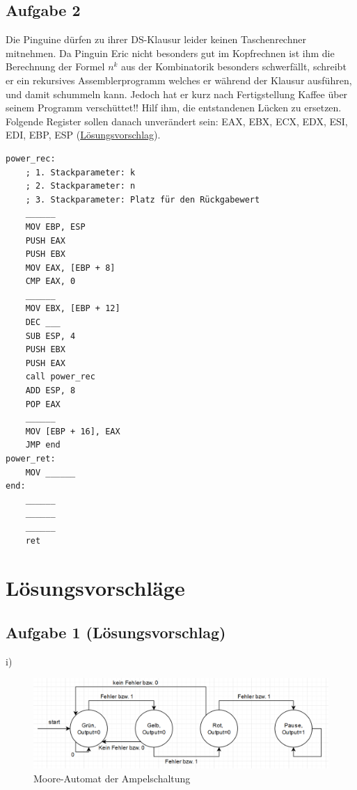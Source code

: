 \documentclass{article}
\begin{document}
\subsection{Aufgabe 2}
Die Pinguine dürfen zu ihrer DS-Klausur leider keinen Taschenrechner mitnehmen. Da Pinguin Eric nicht besonders gut im Kopfrechnen ist ihm die Berechnung der Formel $n^k$ aus der Kombinatorik besonders schwerfällt, schreibt er ein rekursives Assemblerprogramm welches er während der Klausur ausführen, und damit schummeln kann. Jedoch hat er kurz nach Fertigstellung Kaffee über seinem Programm verschüttet!!
Hilf ihm, die entstandenen Lücken zu ersetzen.
Folgende Register sollen danach unverändert sein:
EAX, EBX, ECX, EDX, ESI, EDI, EBP, ESP (\hyperref[sec:lsg02]{Lösungsvorschlag}).
\begin{verbatim}
power_rec:
    ; 1. Stackparameter: k
    ; 2. Stackparameter: n
    ; 3. Stackparameter: Platz für den Rückgabewert
    ______
    MOV EBP, ESP
    PUSH EAX
    PUSH EBX
    MOV EAX, [EBP + 8]
    CMP EAX, 0
    ______
    MOV EBX, [EBP + 12]
    DEC ___
    SUB ESP, 4
    PUSH EBX
    PUSH EAX
    call power_rec
    ADD ESP, 8
    POP EAX
    ______
    MOV [EBP + 16], EAX
    JMP end
power_ret:
    MOV ______
end:
    ______
    ______
    ______
    ret
\end{verbatim}

\newpage

\section{Lösungsvorschläge}

\subsection{Aufgabe 1 (Lösungsvorschlag)}
i)
\begin{figure}[H]
\centering
\includegraphics[scale=0.45]{automat.png}
\caption{Moore-Automat der Ampelschaltung}
\end{figure}
\end{document}
